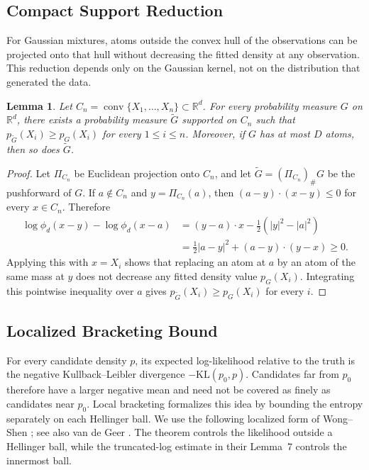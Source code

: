 \documentclass[11pt]{article}
\newtheorem{lemma}[theorem]{Lemma}
\theoremstyle{definition}
\numberwithin{equation}{section}
\newcommand{\R}{\mathbb{R}}
\DeclareMathOperator{\conv}{conv}
\begin{document}
\subsection{Compact Support Reduction}
\label{sec:compact-support-reduction}

For Gaussian mixtures, atoms outside the convex hull of the observations can
be projected onto that hull without decreasing the fitted density at any
observation. This reduction depends only on the Gaussian kernel, not on the
distribution that generated the data.

\begin{lemma}
\label{lem:convex-support}
Let $C_n=\conv\{X_1,\dots,X_n\}\subset\R^d$. For every probability measure $G$ on $\R^d$, there exists a probability measure $\widetilde G$ supported on $C_n$ such that $p_{\widetilde G}(X_i)\ge p_G(X_i)$ for every $1\le i\le n$. Moreover, if $G$ has at most $D$ atoms, then so does $\widetilde G$.
\end{lemma}

\begin{proof}
Let $\Pi_{C_n}$ be Euclidean projection onto $C_n$, and let $\widetilde G=(\Pi_{C_n})_\#G$ be the pushforward of $G$. If $a\notin C_n$ and $y=\Pi_{C_n}(a)$, then $(a-y)\cdot(x-y)\le0$ for every $x\in C_n$.
Therefore
\begin{align*}
    \log \phi_d(x-y)-\log \phi_d(x-a)
    &=
    (y-a)\cdot x-\frac12(|y|^2-|a|^2) \\
    &=
    \frac12|a-y|^2+(a-y)\cdot(y-x)\ge0.
\end{align*}
Applying this with $x=X_i$ shows that replacing an atom at $a$ by an atom of the same mass at $y$ does not decrease any fitted density value $p_G(X_i)$. Integrating this pointwise inequality over $a$ gives $p_{\widetilde G}(X_i)\ge p_G(X_i)$ for every $i$.
\end{proof}

\subsection{Localized Bracketing Bound}
\label{sec:localized-bracketing}

For every candidate density \(p\), its expected log-likelihood relative to
the truth is the negative Kullback--Leibler divergence
\(-\mathrm{KL}(p_0,p)\). Candidates far from \(p_0\) therefore have a
larger negative mean and need not be covered as
finely as candidates near \(p_0\). Local bracketing formalizes this idea by
bounding the entropy separately on each Hellinger ball. We use the following
localized form of Wong--Shen
\cite[Theorem~1, the remark following it, and Lemma~7]{wong1995probability};
see also van de Geer \cite[Chapter~7]{vandegeer2000empirical}. The theorem
controls the likelihood outside a Hellinger ball, while the truncated-log
estimate in their Lemma~7 controls the innermost ball.
\end{document}
